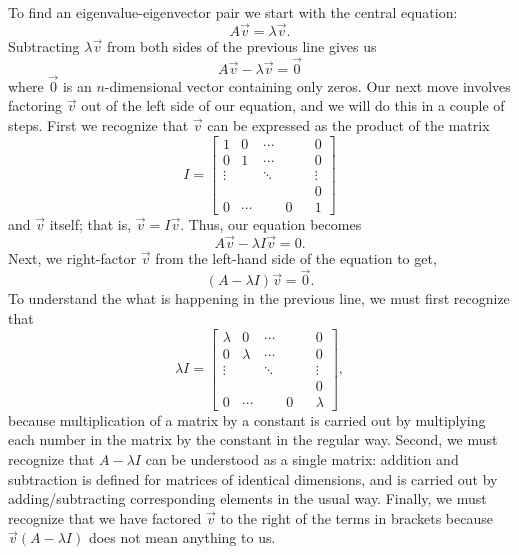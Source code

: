 \documentclass[../book.tex]{subfiles}
\begin{document}
To find an eigenvalue-eigenvector pair we start with the central equation:
\begin{equation}\label{eq:eig-1}
A \vec{v} = \lambda \vec{v}.
\end{equation}
Subtracting \(\lambda \vec{v}\) from both sides of the previous line gives us
\begin{equation}\label{eq:eig-2}
A \vec{v} - \lambda \vec{v} = \vec{0}
\end{equation}
where \(\vec{0}\) is an \(n\)-dimensional vector containing only zeros. Our next move involves factoring \(\vec{v}\) out of the left side of our equation, and we will do this in a couple of steps. First we recognize that \(\vec{v}\) can be expressed as the product of the matrix
\begin{equation}\label{eq:eig-3}
I =
\begin{bmatrix}
  1 & 0 & \cdots & & &0 \\
  0 & 1 & \cdots & && 0 \\
  \vdots & & \ddots & & & \vdots \\
         & & & & &0 \\
  0 & \cdots &  &0 && 1
\end{bmatrix}
\end{equation}
and \(\vec{v}\) itself; that is, \(\vec{v} = I  \vec{v}\). Thus, our equation becomes
\begin{equation}\label{eq:eig-4}
A \vec{v} - \lambda I \vec{v} = 0.
\end{equation}
Next, we right-factor \(\vec{v}\) from the left-hand side of the equation to get,
\begin{equation}\label{eq:eig-5}
(A - \lambda I) \vec{v} = \vec{0}.
\end{equation}
To understand the what is happening in the previous line, we must first recognize that
\begin{equation}\label{eq:eig-6}
\lambda  I =
\begin{bmatrix}
  \lambda & 0 & \cdots & & &0 \\
  0 & \lambda & \cdots & && 0 \\
  \vdots & & \ddots & & & \vdots \\
         & & & & &0 \\
  0 & \cdots &  &0 && \lambda
\end{bmatrix},
\end{equation}
because multiplication of a matrix by a constant is carried out by multiplying each number in the matrix by the constant in the regular way. Second, we must recognize that \(A - \lambda I\) can be understood as a single matrix: addition and subtraction is defined for matrices of identical dimensions, and is carried out by adding/subtracting corresponding elements in the usual way. Finally, we must recognize that we have factored \(\vec{v}\) to the right of the terms in brackets because \(\vec{v} ( A - \lambda I)\) does not mean anything to us.
\end{document}
